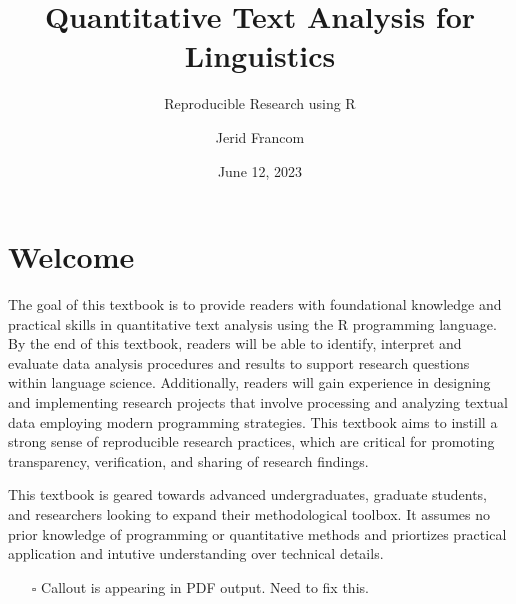 \documentclass[
  letterpaper,
]{latex/krantz}
\title{Quantitative Text Analysis for Linguistics}
\subtitle{Reproducible Research using R}
\author{Jerid Francom}
\date{June 12, 2023}
\providecommand{\tightlist}{%
  \setlength{\itemsep}{0pt}\setlength{\parskip}{0pt}}\usepackage{longtable,booktabs,array}
\renewcommand*\contentsname{Table of contents}
\newcommand\contentsname{Table of contents}
\begin{document}
\maketitle
\ifdefined\Shaded\renewenvironment{Shaded}{\begin{tcolorbox}[borderline west={3pt}{0pt}{shadecolor}, interior hidden, breakable, boxrule=0pt, sharp corners, frame hidden, enhanced]}{\end{tcolorbox}}\fi

\renewcommand*\contentsname{Table of contents}
{
\setcounter{tocdepth}{2}
\tableofcontents
}

\hypertarget{welcome}{%
\chapter*{Welcome}\label{welcome}}


The goal of this textbook is to provide readers with foundational
knowledge and practical skills in quantitative text analysis using the R
programming language. By the end of this textbook, readers will be able
to identify, interpret and evaluate data analysis procedures and results
to support research questions within language science. Additionally,
readers will gain experience in designing and implementing research
projects that involve processing and analyzing textual data employing
modern programming strategies. This textbook aims to instill a strong
sense of reproducible research practices, which are critical for
promoting transparency, verification, and sharing of research findings.

This textbook is geared towards advanced undergraduates, graduate
students, and researchers looking to expand their methodological
toolbox. It assumes no prior knowledge of programming or quantitative
methods and priortizes practical application and intutive understanding
over technical details.

\begin{itemize}
\tightlist
\item[$\square$]
  Callout is appearing in PDF output. Need to fix this.
\end{itemize}
\end{document}
